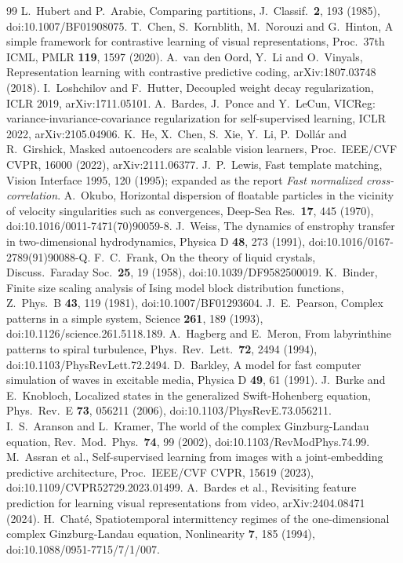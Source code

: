 \documentclass[11pt,a4paper]{article}
\begin{document}
\begin{thebibliography}{99}
 L.~Hubert and P.~Arabie, Comparing partitions, J.\ Classif.\ \textbf{2}, 193 (1985), doi:10.1007/BF01908075.
 T.~Chen, S.~Kornblith, M.~Norouzi and G.~Hinton, A simple framework for contrastive learning of visual representations, Proc.\ 37th ICML, PMLR \textbf{119}, 1597 (2020).
 A.~van den Oord, Y.~Li and O.~Vinyals, Representation learning with contrastive predictive coding, arXiv:1807.03748 (2018).
 I.~Loshchilov and F.~Hutter, Decoupled weight decay regularization, ICLR 2019, arXiv:1711.05101.
 A.~Bardes, J.~Ponce and Y.~LeCun, VICReg: variance-invariance-covariance regularization for self-supervised learning, ICLR 2022, arXiv:2105.04906.
 K.~He, X.~Chen, S.~Xie, Y.~Li, P.~Doll\'ar and R.~Girshick, Masked autoencoders are scalable vision learners, Proc.\ IEEE/CVF CVPR, 16000 (2022), arXiv:2111.06377.
 J.~P.~Lewis, Fast template matching, Vision Interface 1995, 120 (1995); expanded as the report \emph{Fast normalized cross-correlation}.
 A.~Okubo, Horizontal dispersion of floatable particles in the vicinity of velocity singularities such as convergences, Deep-Sea Res.\ \textbf{17}, 445 (1970), doi:10.1016/0011-7471(70)90059-8.
 J.~Weiss, The dynamics of enstrophy transfer in two-dimensional hydrodynamics, Physica D \textbf{48}, 273 (1991), doi:10.1016/0167-2789(91)90088-Q.
 F.~C.~Frank, On the theory of liquid crystals, Discuss.\ Faraday Soc.\ \textbf{25}, 19 (1958), doi:10.1039/DF9582500019.
 K.~Binder, Finite size scaling analysis of Ising model block distribution functions, Z.\ Phys.\ B \textbf{43}, 119 (1981), doi:10.1007/BF01293604.
 J.~E.~Pearson, Complex patterns in a simple system, Science \textbf{261}, 189 (1993), doi:10.1126/science.261.5118.189.
 A.~Hagberg and E.~Meron, From labyrinthine patterns to spiral turbulence, Phys.\ Rev.\ Lett.\ \textbf{72}, 2494 (1994), doi:10.1103/PhysRevLett.72.2494.
 D.~Barkley, A model for fast computer simulation of waves in excitable media, Physica D \textbf{49}, 61 (1991).
 J.~Burke and E.~Knobloch, Localized states in the generalized Swift-Hohenberg equation, Phys.\ Rev.\ E \textbf{73}, 056211 (2006), doi:10.1103/PhysRevE.73.056211.
 I.~S.~Aranson and L.~Kramer, The world of the complex Ginzburg-Landau equation, Rev.\ Mod.\ Phys.\ \textbf{74}, 99 (2002), doi:10.1103/RevModPhys.74.99.
 M.~Assran et al., Self-supervised learning from images with a joint-embedding predictive architecture, Proc.\ IEEE/CVF CVPR, 15619 (2023), doi:10.1109/CVPR52729.2023.01499.
 A.~Bardes et al., Revisiting feature prediction for learning visual representations from video, arXiv:2404.08471 (2024).
 H.~Chat\'e, Spatiotemporal intermittency regimes of the one-dimensional complex Ginzburg-Landau equation, Nonlinearity \textbf{7}, 185 (1994), doi:10.1088/0951-7715/7/1/007.
\end{thebibliography}
\end{document}

